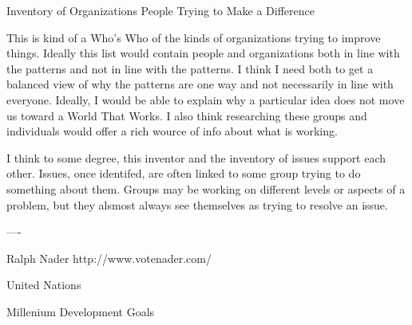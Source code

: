 Inventory of Organizations
People Trying to Make a Difference

This is kind of a Who's Who of the kinds of organizations trying to improve things. Ideally this list would contain people and organizations both in line with the patterns and not in line with the patterns. I think I need both to get a balanced view of why the patterns are one way and not necessarily in line with everyone. Ideally, I would be able to explain why a particular idea does not move us toward a World That Works. I also think researching these groups and individuals would offer a rich wource of info about what is working.

I think to some degree, this inventor and the inventory of issues support each other. Issues, once identifed, are often linked to some group trying to do something about them. Groups may be working on different levels or aspects of a problem, but they alsmost always see themselves as trying to resolve an issue.

----

Ralph Nader
http://www.votenader.com/


United Nations

	Millenium Development Goals
